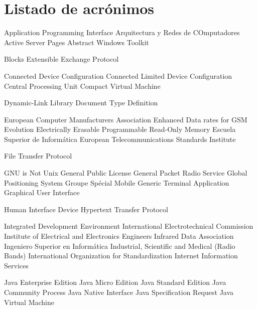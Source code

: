 
\chapter{Listado de acrónimos}

{\small
\begin{acronym}[XXXXXXXX]
       {Application Programming Interface}
      {Arquitectura y Redes de COmputadores}
       {Active Server Pages}
       {Abstract Windows Toolkit}

      {Blocks Extensible Exchange Protocol}
  
       {Connected Device Configuration}
      {Connected Limited Device Configuration}
       {Central Processing Unit}
       {Compact Virtual Machine}

       {Dynamic-Link Library}
       {Document Type Definition}

      {European Computer Manufacturers Association}
      {Enhanced Data rates for \acs{GSM} Evolution}
    {Electrically Erasable Programmable Read-Only Memory}
       {Escuela Superior de Informática}
      {European Telecommunications Standards Institute}

       {File Transfer Protocol}

       {GNU is Not Unix}
       {General Public License}
      {General Packet Radio Service}
       {Global Positioning System}
       {Groupe Spécial Mobile}
       {Generic Terminal Application}
       {Graphical User Interface}

       {Human Interface Device}
      {Hypertext Transfer Protocol}

       {Integrated Development Environment}
       {International Electrotechnical Commission}
      {Institute of Electrical and Electronics Engineers}
      {Infrared Data Association}
       {Ingeniero Superior en Informática}
       {Industrial, Scientific and Medical (Radio Bands)}
       {International Organization for Standardization}
       {Internet Information Services}

    {Java Enterprise Edition}
    {Java Micro Edition}
    {Java Standard Edition}
       {Java Community Process}
       {Java Native Interface}
       {Java Specification Request}
       {Java Virtual Machine}


\end{acronym}}
